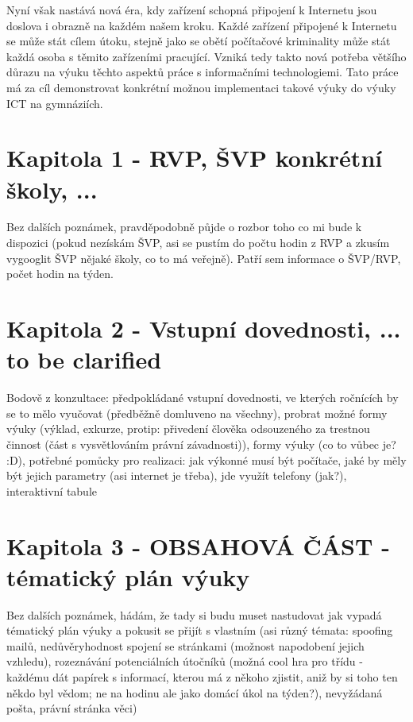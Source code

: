 \documentclass[a4paper, 11pt]{article}
\begin{document}
Nyní však nastává nová éra, kdy zařízení schopná připojení k Internetu jsou doslova i obrazně na každém našem kroku. Každé zařízení připojené k Internetu se může stát cílem útoku, stejně jako se obětí počítačové kriminality může stát každá osoba s těmito zařízeními pracující. Vzniká tedy takto nová potřeba většího důrazu na výuku těchto aspektů práce s informačními technologiemi. Tato práce má za cíl demonstrovat konkrétní možnou implementaci takové výuky do výuky ICT na gymnáziích.

\section{Kapitola 1 - RVP, ŠVP konkrétní školy, ...}
Bez dalších poznámek, pravděpodobně půjde o rozbor toho co mi bude k dispozici (pokud nezískám ŠVP, asi se pustím do počtu hodin z RVP a zkusím vygooglit ŠVP nějaké školy, co to má veřejně). Patří sem informace o ŠVP/RVP, počet hodin na týden.

\section{Kapitola 2 - Vstupní dovednosti, ... to be clarified}
Bodově z konzultace: předpokládané vstupní dovednosti, ve kterých ročnících by se to mělo vyučovat (předběžně domluveno na všechny), probrat možné formy výuky (výklad, exkurze, protip: přivedení člověka odsouzeného za trestnou činnost (část s vysvětlováním právní závadnosti)), formy výuky (co to vůbec je? :D), potřebné pomůcky pro realizaci: jak výkonné musí být počítače, jaké by měly být jejich parametry (asi internet je třeba), jde využít telefony (jak?), interaktivní tabule


\section{Kapitola 3 - OBSAHOVÁ ČÁST - tématický plán výuky}
Bez dalších poznámek, hádám, že tady si budu muset nastudovat jak vypadá tématický plán výuky a pokusit se přijít s vlastním (asi různý témata: spoofing mailů, nedůvěryhodnost spojení se stránkami (možnost napodobení jejich vzhledu), rozeznávání potenciálních útočníků (možná cool hra pro třídu - každému dát papírek s informací, kterou má z někoho zjistit, aniž by si toho ten někdo byl vědom; ne na hodinu ale jako domácí úkol na týden?), nevyžádaná pošta, právní stránka věci)
\end{document}
